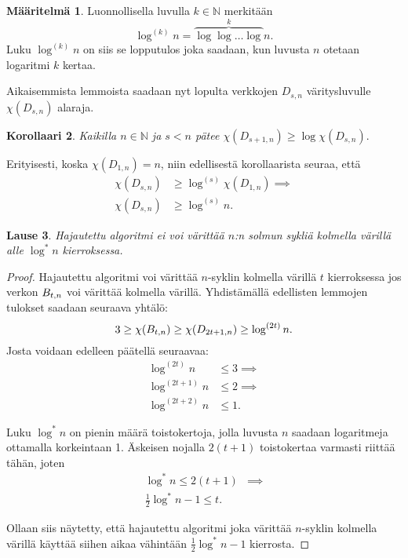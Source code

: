 \documentclass[finnish]{tktltiki2}
\newtheorem{lau}{Lause}
\newtheorem{kor}[lau]{Korollaari}
\theoremstyle{definition}
\newtheorem{maar}[lau]{Määritelmä}
\theoremstyle{remark}
\newcommand{\nat}{\mathbb{N}}
\newcommand{\Dsn}{D_{s,n}}
\newcommand{\Dssn}{D_{s+1,n}}
\begin{document}
\begin{maar}
    Luonnollisella luvulla $k \in \nat$ merkitään
    \begin{equation*}
        \log^{(k)} n = \overbrace{\log \log \dots \log}^{k} n.
    \end{equation*}
    Luku $\log^{(k)} n$ on siis se lopputulos joka saadaan, kun luvusta $n$
    otetaan logaritmi $k$ kertaa.
\end{maar}

Aikaisemmista lemmoista saadaan nyt lopulta verkkojen $\Dsn$ vä\-ri\-tys\-lu\-vul\-le
$\chi(\Dsn)$ alaraja.

\begin{kor}
    Kaikilla $n \in \nat$ ja $s < n$ pätee $\chi(\Dssn) \geq \log \chi(\Dsn).$
\end{kor}

Erityisesti, koska $\chi(D_{1,n}) = n$, niin edellisestä korollaarista seuraa, että
%
\begin{align*}
    \chi(\Dsn) &\geq \log^{(s)} \chi(D_{1,n}) \implies \\
    \chi(\Dsn) &\geq \log^{(s)} n.
\end{align*}

\begin{lau}
    Hajautettu algoritmi ei voi värittää $n$:n solmun sykliä kolmella värillä
    alle $\log^* n$ kierroksessa.
\end{lau}

\begin{proof}
    Hajautettu algoritmi voi värittää $n$-syklin kolmella värillä $t$
    kierroksessa jos verkon $B_{t,n}$ voi värittää kolmella värillä. Yhdistämällä
    edellisten lemmojen tulokset saadaan seuraava yhtälö:
    \begin{equation*}
        3 \geq \chi(B_{t,n}) \geq \chi(D_{2t+1, n}) \geq \log^{(2t)} n.
    \end{equation*}
    Josta voidaan edelleen päätellä seuraavaa:
    \begin{align*}
        \log^{(2t)}   n &\leq 3 \implies \\
        \log^{(2t+1)} n &\leq 2 \implies \\
        \log^{(2t+2)} n &\leq 1.
    \end{align*}

    Luku $\log^* n$ on pienin määrä toistokertoja, jolla luvusta $n$ saadaan
    logaritmeja ottamalla korkeintaan 1. Äskeisen nojalla $2(t+1)$ toistokertaa
    varmasti riittää tähän, joten
    \begin{align*}
        \log^* n \leq 2(t+1)            & \implies \\
        \frac{1}{2} \log^* n - 1 \leq t. &
    \end{align*}

    Ollaan siis näytetty, että hajautettu algoritmi joka värittää $n$-syklin
    kolmella värillä käyttää siihen aikaa vähintään $\frac{1}{2} \log^* n - 1$
    kierrosta.
\end{proof}
\end{document}
